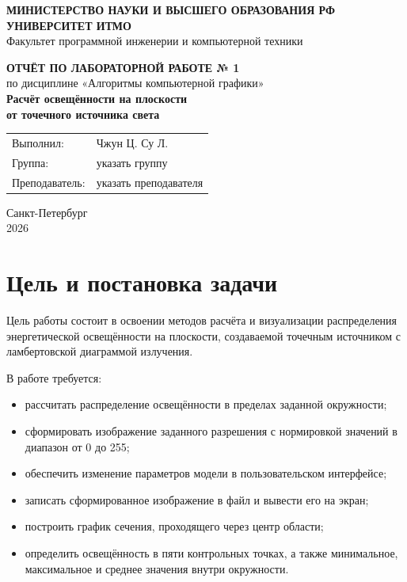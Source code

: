 \documentclass[a4paper,12pt]{article}
\newcommand{\studentname}{Чжун Ц. Су Л.}
\newcommand{\studentgroup}{указать группу}
\newcommand{\teachername}{указать преподавателя}
\newcommand{\reportyear}{2026}
\begin{document}
\begin{titlepage}
  \thispagestyle{empty}
  \begin{center}
    \textbf{МИНИСТЕРСТВО НАУКИ И ВЫСШЕГО ОБРАЗОВАНИЯ РФ}\\[0.6em]
    \textbf{УНИВЕРСИТЕТ ИТМО}\\[0.6em]
    Факультет программной инженерии и компьютерной техники

    \vfill

    {\Large\bfseries ОТЧЁТ ПО ЛАБОРАТОРНОЙ РАБОТЕ № 1}\\[1.2em]
    {\large по дисциплине «Алгоритмы компьютерной графики»}\\[2em]
    {\Large\bfseries Расчёт освещённости на плоскости\\
    от точечного источника света}

    \vfill

    \begin{tabular}{@{}ll@{}}
      Выполнил: & \studentname \\
      Группа: & \studentgroup \\
      Преподаватель: & \teachername
    \end{tabular}

    \vfill
    Санкт-Петербург\\
    \reportyear
  \end{center}
\end{titlepage}

\tableofcontents
\newpage

\section{Цель и постановка задачи}

Цель работы состоит в освоении методов расчёта и визуализации распределения
энергетической освещённости на плоскости, создаваемой точечным источником с
ламбертовской диаграммой излучения.

В работе требуется:
\begin{itemize}
  \item рассчитать распределение освещённости в пределах заданной окружности;
  \item сформировать изображение заданного разрешения с нормировкой значений
        в диапазон от 0 до 255;
  \item обеспечить изменение параметров модели в пользовательском интерфейсе;
  \item записать сформированное изображение в файл и вывести его на экран;
  \item построить график сечения, проходящего через центр области;
  \item определить освещённость в пяти контрольных точках, а также минимальное,
        максимальное и среднее значения внутри окружности.
\end{itemize}
\end{document}
